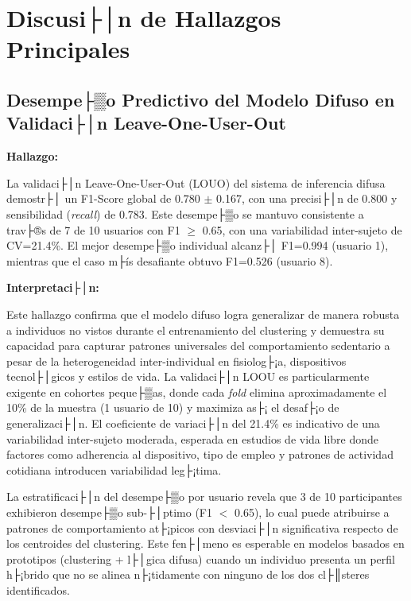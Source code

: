 \section{Discusi├│n de Hallazgos Principales}
\label{sec:discusion_hallazgos}

\subsection{Desempe├▒o Predictivo del Modelo Difuso en Validaci├│n Leave-One-User-Out}
\label{subsec:discusion_desempeno_loou}

\textbf{Hallazgo:}

La validaci├│n Leave-One-User-Out (LOUO) del sistema de inferencia difusa demostr├│ un F1-Score global de 0.780 $\pm$ 0.167, con una precisi├│n de 0.800 y sensibilidad (\textit{recall}) de 0.783. Este desempe├▒o se mantuvo consistente a trav├®s de 7 de 10 usuarios con F1 $\geq$ 0.65, con una variabilidad inter-sujeto de CV=21.4\%. El mejor desempe├▒o individual alcanz├│ F1=0.994 (usuario 1), mientras que el caso m├ís desafiante obtuvo F1=0.526 (usuario 8).

\textbf{Interpretaci├│n:}

Este hallazgo confirma que el modelo difuso logra generalizar de manera robusta a individuos no vistos durante el entrenamiento del clustering y demuestra su capacidad para capturar patrones universales del comportamiento sedentario a pesar de la heterogeneidad inter-individual en fisiolog├¡a, dispositivos tecnol├│gicos y estilos de vida. La validaci├│n LOOU es particularmente exigente en cohortes peque├▒as, donde cada \textit{fold} elimina aproximadamente el 10\% de la muestra (1 usuario de 10) y maximiza as├¡ el desaf├¡o de generalizaci├│n. El coeficiente de variaci├│n del 21.4\% es indicativo de una variabilidad inter-sujeto moderada, esperada en estudios de vida libre donde factores como adherencia al dispositivo, tipo de empleo y patrones de actividad cotidiana introducen variabilidad leg├¡tima.

La estratificaci├│n del desempe├▒o por usuario revela que 3 de 10 participantes exhibieron desempe├▒o sub-├│ptimo (F1 $<$ 0.65), lo cual puede atribuirse a patrones de comportamiento at├¡picos con desviaci├│n significativa respecto de los centroides del clustering. Este fen├│meno es esperable en modelos basados en prototipos (clustering + l├│gica difusa) cuando un individuo presenta un perfil h├¡brido que no se alinea n├¡tidamente con ninguno de los dos cl├║steres identificados.

